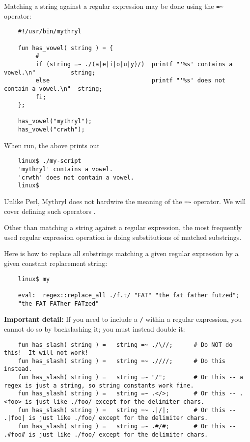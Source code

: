 Matching a string against a regular expression may be done using the {\tt \verb|=~|} 
operator:

\begin{verbatim}
    #!/usr/bin/mythryl

    fun has_vowel( string ) = {
         #
         if (string =~ ./(a|e|i|o|u|y)/)  printf "'%s' contains a vowel.\n"          string;
         else                             printf "'%s' does not contain a vowel.\n"  string;
         fi;
    };

    has_vowel("mythryl");
    has_vowel("crwth");
\end{verbatim}

When run, the above prints out

\begin{verbatim}
    linux$ ./my-script
    'mythryl' contains a vowel.
    'crwth' does not contain a vowel.
    linux$
\end{verbatim}

Unlike Perl, Mythryl does not hardwire the meaning of the {\tt \verb|=~|} operator. 
We will cover defining such operators 
.

Other than matching a string against a regular expression, 
the most frequently used regular expression operation is 
doing substitutions of matched substrings.

Here is how to replace all substrings matching a given 
regular expression by a given constant replacement string:


\begin{verbatim}
    linux$ my

    eval:  regex::replace_all ./f.t/ "FAT" "the fat father futzed";
    "the FAT FATher FATzed"
\end{verbatim}


\textbf{Important detail:} If you need to include a {\tt /} within 
a regular expression, you cannot do so by backslashing it; 
you must instead double it: 

\begin{verbatim}
    fun has_slash( string ) =   string =~ ./\//;      # Do NOT do this!  It will not work!
    fun has_slash( string ) =   string =~ .////;      # Do this instead.
    fun has_slash( string ) =   string =~ "/";        # Or this -- a regex is just a string, so string constants work fine.
    fun has_slash( string ) =   string =~ .</>;       # Or this -- .<foo> is just like ./foo/ except for the delimiter chars.
    fun has_slash( string ) =   string =~ .|/|;       # Or this -- .|foo| is just like ./foo/ except for the delimiter chars.
    fun has_slash( string ) =   string =~ .#/#;       # Or this -- .#foo# is just like ./foo/ except for the delimiter chars.
\end{verbatim}

